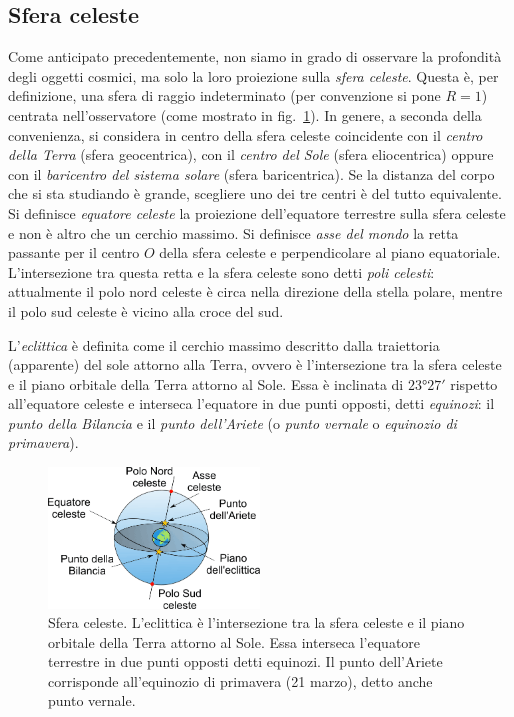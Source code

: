 \subsection{Sfera celeste}\label{sec:posizione-sfera-celeste}
Come anticipato precedentemente, non siamo in grado di osservare la profondità degli oggetti cosmici, ma solo la loro proiezione sulla \emph{sfera celeste}. Questa è, per definizione, una sfera di raggio indeterminato (per convenzione si pone $R=1$) centrata nell'osservatore (come mostrato in fig.~\ref{fig:sfera-celeste}). In genere, a seconda della convenienza, si considera in centro della sfera celeste coincidente con il \emph{centro della Terra} (sfera geocentrica), con il \emph{centro del Sole} (sfera eliocentrica) oppure con il \emph{baricentro del sistema solare} (sfera baricentrica). Se la distanza del corpo che si sta studiando è grande, scegliere uno dei tre centri è del tutto equivalente. Si definisce \emph{equatore celeste} la proiezione dell'equatore terrestre sulla sfera celeste e non è altro che un cerchio massimo. Si definisce \emph{asse del mondo} la retta passante per il centro $O$ della sfera celeste e perpendicolare al piano equatoriale. L'intersezione tra questa retta e la sfera celeste sono detti \emph{poli celesti}: attualmente il polo nord celeste è circa nella direzione della stella polare, mentre il polo sud celeste è vicino alla croce del sud. 

L'\emph{eclittica} è definita come il cerchio massimo descritto dalla traiettoria (apparente) del sole attorno alla Terra, ovvero è l'intersezione tra la sfera celeste e il piano orbitale della Terra attorno al Sole. Essa è inclinata di $\ang{23;27;}$ rispetto all'equatore celeste e interseca l'equatore in due punti opposti, detti \emph{equinozi}: il \emph{punto della Bilancia} e il \emph{punto dell'Ariete} (o \emph{punto vernale} o \emph{equinozio di primavera}).

\begin{figure}
\centering
\includegraphics[width=0.5\textwidth]{immagini/sfera-celeste.png}
\caption{Sfera celeste. L'eclittica è l'intersezione tra la sfera celeste e il piano orbitale della Terra attorno al Sole. Essa interseca l'equatore terrestre in due punti opposti detti equinozi. Il punto dell'Ariete corrisponde all'equinozio di primavera (21 marzo), detto anche punto vernale.}
\label{fig:sfera-celeste}
\end{figure}

